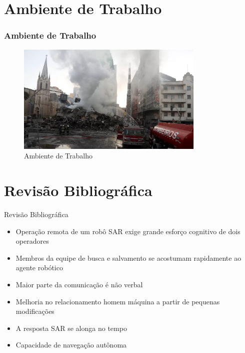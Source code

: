 \documentclass[aspectratio=169]{beamer}
\begin{document}
\section{Ambiente de Trabalho}
\begin{frame}
\frametitle{Ambiente de Trabalho}

\begin{figure}
  \centering
  \includegraphics[width=0.8\textwidth]{paisandu.png}
  \caption{Ambiente de Trabalho \cite{sp2020}}
\end{figure}

\end{frame}

\section{Revisão Bibliográfica}

\begin{frame}{Revisão Bibliográfica}
\begin{itemize}
\item Operação remota de um robô SAR exige grande esforço cognitivo de dois operadores \cite{Robin2004}
\item Membros da equipe de busca e salvamento se acostumam rapidamente ao agente robótico \cite{fin2004}
\item Maior parte da comunicação é não verbal \cite{fin2004}
\item Melhoria no relacionamento homem máquina a partir de pequenas modificações \cite{habib2011}
\item A resposta SAR se alonga no tempo \cite{krui2015}
\item Capacidade de navegação autônoma \cite{tardioli2016}
\end{itemize}
\end{frame}
\end{document}
